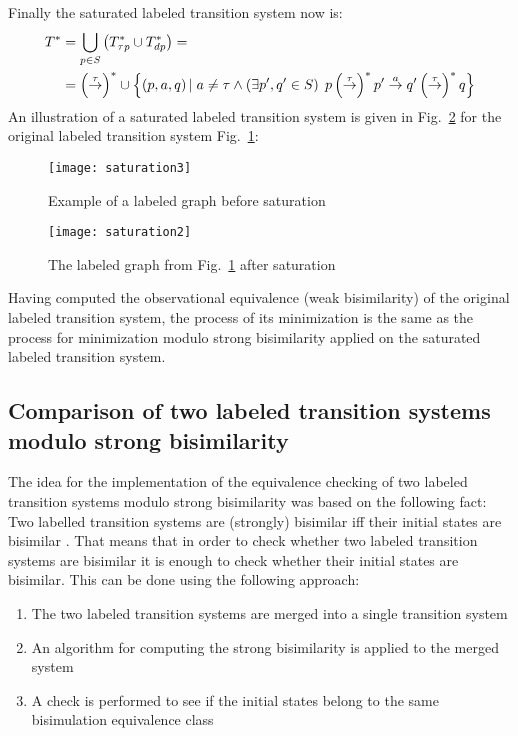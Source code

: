 Finally the saturated labeled transition system now is:
\begin{align*}
	T^{*} &=\bigcup_{p\in \mathit{S}}\left(T^{*}_{\mathit{\tau p}}\cup T^{*}_{dp}\right)=\\
	&=\left(\stackrel{\tau}{\rightarrow}\right)^{*}\cup\left\{\left(p,a,q\right)|\hspace{1mm}a\neq\tau\wedge\left(\exists p',q'\in S\right)\hspace{1mm} p\left(\stackrel{\tau}{\rightarrow}\right)^{*}p'\stackrel{a}{\rightarrow}q'\left(\stackrel{\tau}{\rightarrow}\right)^{*}q\right\}
\end{align*}
An illustration of a saturated labeled transition system is given in Fig.~\ref{fig:saturation2} for the original labeled transition system Fig.~\ref{fig:saturation3}:

\begin{figure}[h]
\centering
\texttt{[image: saturation3]}
\caption{Example of a labeled graph before saturation}
\label{fig:saturation3}
\end{figure}
\begin{figure}[h]
\centering
\texttt{[image: saturation2]}
\caption{The labeled graph from Fig.~\ref{fig:saturation3} after saturation}
\label{fig:saturation2}
\end{figure}

Having computed the observational equivalence (weak bisimilarity) of the original labeled transition system, the process of its minimization is the same as the process for minimization modulo strong bisimilarity applied on the saturated labeled transition system.

\subsection{Comparison of two labeled transition systems modulo strong bisimilarity}
The idea for the implementation of the equivalence checking of two labeled transition systems modulo strong bisimilarity was based on the following fact: Two labelled transition systems are (strongly) bisimilar iff their initial states are bisimilar \cite{ModellingAndAnalysis}. That means that in order to check whether two labeled transition systems are bisimilar it is enough to check whether their initial states are bisimilar. This can be done using the following approach:
\begin{enumerate}
	\item The two labeled transition systems are merged into a single transition system
	\item An algorithm for computing the strong bisimilarity is applied to the merged system
	\item A check is performed to see if the initial states belong to the same bisimulation equivalence class
\end{enumerate}

